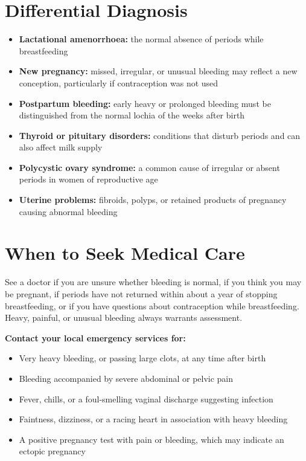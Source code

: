 \section*{Differential Diagnosis}
\begin{itemize}
    \item \textbf{Lactational amenorrhoea:} the normal absence of periods while breastfeeding
    \item \textbf{New pregnancy:} missed, irregular, or unusual bleeding may reflect a new conception, particularly if contraception was not used
    \item \textbf{Postpartum bleeding:} early heavy or prolonged bleeding must be distinguished from the normal lochia of the weeks after birth
    \item \textbf{Thyroid or pituitary disorders:} conditions that disturb periods and can also affect milk supply
    \item \textbf{Polycystic ovary syndrome:} a common cause of irregular or absent periods in women of reproductive age
    \item \textbf{Uterine problems:} fibroids, polyps, or retained products of pregnancy causing abnormal bleeding
\end{itemize}

\section*{When to Seek Medical Care}
See a doctor if you are unsure whether bleeding is normal, if you think you may be pregnant, if periods have not returned within about a year of stopping breastfeeding, or if you have questions about contraception while breastfeeding. Heavy, painful, or unusual bleeding always warrants assessment.

\textbf{Contact your local emergency services for:}
\begin{itemize}
    \item Very heavy bleeding, or passing large clots, at any time after birth
    \item Bleeding accompanied by severe abdominal or pelvic pain
    \item Fever, chills, or a foul-smelling vaginal discharge suggesting infection
    \item Faintness, dizziness, or a racing heart in association with heavy bleeding
    \item A positive pregnancy test with pain or bleeding, which may indicate an ectopic pregnancy
\end{itemize}

